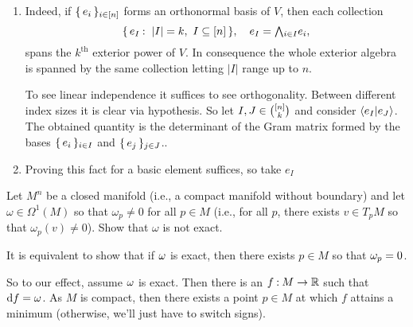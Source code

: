 \documentclass[12pt]{memoir}
\begin{document}
\begin{ptcbr}
\begin{enumerate}
    \item Indeed, if $\{\,e_i\,\}_{i\in\left\lbrack n\right\rbrack}$ forms an orthonormal basis of $V$, then each collection 
    $$\set{e_{I}\:\ |I|=k,\ I\subseteq\bonj{n}},\quad e_{ I}=\exterior_{i\in I}e_i,$$
    spans the $k^{\text{th}}$ exterior power of $V$. In consequence the whole exterior algebra is spanned by the same collection letting $|I|$ range up to $n$.\par
    To see linear independence it suffices to see orthogonality. Between different index sizes it is clear via hypothesis. So let $I,J\in\binom{\left\lbrack n\right\rbrack}{k}$ and consider $\braket{e_I}{e_J}$. The obtained quantity is the determinant of the Gram matrix formed by the bases $\{\,e_i\,\}_{i\in I}$ and $\{\,e_j\,\}_{j\in J}$..
    \item Proving this fact for a basic element suffices, so take $e_I$
\end{enumerate}
\end{ptcbr}

\begin{Ej}
    Let $M^n$ be a closed manifold (i.e., a compact manifold without boundary) and let $\omega \in \Omega^1(M)$ so that $\omega_p \neq 0$ for all $p \in M$ (i.e., for all $p$, there exists $v \in T_pM$ so that $\omega_p(v) \neq 0$). Show that $\omega$ is not exact.
\end{Ej}

\begin{ptcbr}
 It is equivalent to show that if $\omega$ is exact, then there exists $p\in M$ so that $\omega_p=0$.\par
So to our effect, assume $\omega$ is exact. Then there is an $f\mathbin{:} M\to\mathbb{R}$ such that $\dd f=\omega$. As $M$ is compact, then there exists a point $p\in M$ at which $f$ attains a minimum (otherwise, we'll just have to switch signs). 
\end{ptcbr}
\end{document}
